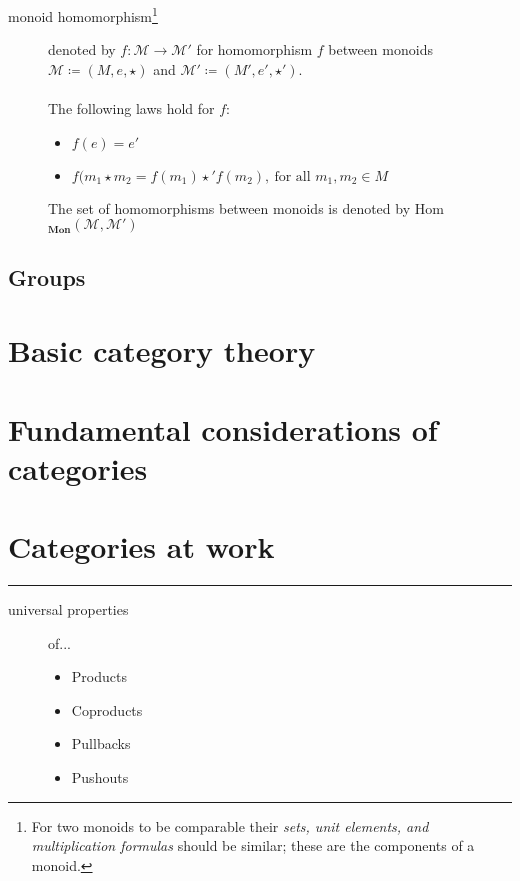 \documentclass{article}
\begin{document}
\begin{description}
\item[monoid homomorphism\footnote{For two monoids to be comparable their \emph{sets, unit elements, and multiplication formulas} should be similar; these are the components of a monoid.}] denoted by $f: \mathcal{M} \rightarrow \mathcal{M'}$ for homomorphism $f$ between monoids $\mathcal{M} \coloneqq (M, e, \star)$ and $\mathcal{M'} \coloneqq (M', e', \star')$.
\\\\
The following laws hold for $f$:
\begin{itemize}
\item $f(e) = e'$
\item $f(m_1 \star m_2 = f(m_1) \star' f(m_2),\ \text{for all } m_1, m_2 \in M$
\end{itemize}
The set of homomorphisms between monoids is denoted by Hom$_\textbf{Mon} (\mathcal{M}, \mathcal{M'})$
\end{description}








\subsection{Groups}












\section{Basic category theory}
\section{Fundamental considerations of categories}
\section{Categories at work}


\rule{\textwidth}{0.4pt}
\begin{description}
\item[universal properties] of...
\begin{itemize}
\item Products
\item Coproducts
\item Pullbacks
\item Pushouts
\end{itemize}
\end{description}
\end{document}
